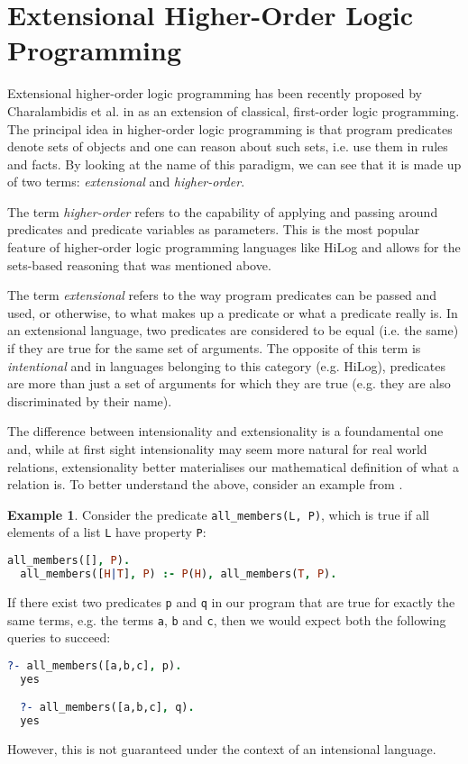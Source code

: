 \documentclass[inscr,ack,preface]{dithesis}
\theoremstyle{definition}
\newtheorem{example}{Example}[chapter]
\begin{document}
\section{Extensional Higher-Order Logic Programming}
Extensional higher-order logic programming has been recently proposed by Charalambidis et al. in \cite{DBLP:journals/tocl/CharalambidisHRW13} as an extension of classical, first-order logic programming. The principal idea in higher-order logic programming is that program predicates denote sets of objects and one can reason about such sets, i.e. use them in rules and facts. By looking at the name of this paradigm, we can see that it is made up of two terms: \emph{extensional} and \emph{higher-order}.

The term \emph{higher-order} refers to the capability of applying and passing around predicates and predicate variables as parameters. This is the most popular feature of higher-order logic programming languages like HiLog and allows for the sets-based reasoning that was mentioned above.

The term \emph{extensional} refers to the way program predicates can be passed and used, or otherwise, to what makes up a predicate or what a predicate really is. In an extensional language, two predicates are considered to be equal (i.e. the same) if they are true for the same set of arguments. The opposite of this term is \emph{intentional} and in languages belonging to this category (e.g. HiLog), predicates are more than just a set of arguments for which they are true (e.g. they are also discriminated by their name).

The difference between intensionality and extensionality is a foundamental one and, while at first sight intensionality may seem more natural for real world relations, extensionality better materialises our mathematical definition of what a relation is. To better understand the above, consider an example from \cite{DBLP:journals/tocl/CharalambidisHRW13}.

\begin{example} Consider the predicate \texttt{all\_members(L, P)}, which is true if all elements of a list \texttt{L} have property \texttt{P}:
\begin{lstlisting}[language=Prolog,frame=single]
  all_members([], P).
  all_members([H|T], P) :- P(H), all_members(T, P).
\end{lstlisting}

If there exist two predicates \texttt{p} and \texttt{q} in our program that are true for exactly the same terms, e.g. the terms \texttt{a}, \texttt{b} and \texttt{c}, then we would expect both the following queries to succeed:
\begin{lstlisting}[language=Prolog,frame=single]
  ?- all_members([a,b,c], p).
  yes

  ?- all_members([a,b,c], q).
  yes
\end{lstlisting}
However, this is not guaranteed under the context of an intensional language.
\end{example}
\end{document}
